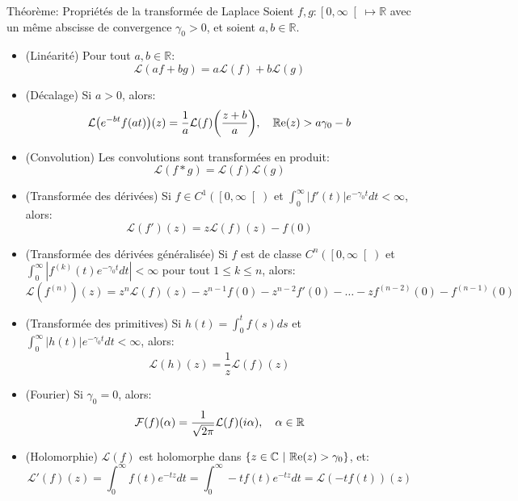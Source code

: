 \documentclass[a4paper]{article}
\begin{document}
\begin{parag}{Théorème: Propriétés de la transformée de Laplace}
    Soient $f, g: \left[0, \infty\right[ \mapsto \mathbb{R}$ avec un même abscisse de convergence $\gamma_0 > 0$, et soient $a, b \in \mathbb{R}$.
    \begin{itemize}
        \item (Linéarité) Pour tout $a, b \in \mathbb{R}$:
            \[\mathcal{L}\left(af + bg\right) = a\mathcal{L}\left(f\right) + b\mathcal{L}\left(g\right)\]
        \item (Décalage) Si $a > 0$, alors:
            \[\mathcal{L}\left(e^{-bt}f\left(at\right)\right)\left(z\right) = \frac{1}{a} \mathcal{L}\left(f\right)\left(\frac{z+b}{a}\right), \mathspace \cre\left(z\right) > a \gamma_0  - b\]
        \item (Convolution) Les convolutions sont transformées en produit:
            \[\mathcal{L}\left(f*g\right) = \mathcal{L}\left(f\right) \mathcal{L}\left(g\right)\]
        \item (Transformée des dérivées) Si $f \in C^1\left(\left[0, \infty\right[ \right)$ et $\int_{0}^{\infty} \left|f'\left(t\right)\right| e^{- \gamma_0 t} dt < \infty$, alors:
            \[\mathcal{L}\left(f'\right)\left(z\right) = z \mathcal{L}\left(f\right)\left(z\right) - f\left(0\right)\]
        \item (Transformée des dérivées généralisée) Si $f$ est de classe $C^n\left(\left[0, \infty\right[ \right)$ et $\int_{0}^{\infty} \left|f^{\left(k\right)}\left(t\right) e^{- \gamma_0 t} dt\right| < \infty$ pour tout $1 \leq k \leq n$, alors:
            \[\mathcal{L}\left(f^{\left(n\right)}\right)\left(z\right) = z^n \mathcal{L}\left(f\right)\left(z\right) - z^{n-1} f\left(0\right) - z^{n-2} f'\left(0\right) - \ldots - z f^{\left(n-2\right)}\left(0\right) - f^{\left(n-1\right)}\left(0\right)\]
        \item (Transformée des primitives) Si $h\left(t\right) = \int_{0}^{t} f\left(s\right)ds$ et $\int_{0}^{\infty} \left|h\left(t\right)\right| e^{-\gamma_0 t} dt < \infty$, alors:
            \[\mathcal{L}\left(h\right)\left(z\right) = \frac{1}{z} \mathcal{L}\left(f\right)\left(z\right)\]
        \item (Fourier) Si $\gamma_0 = 0$, alors:
            \[\mathcal{F}\left(f\right)\left(\alpha\right) = \frac{1}{\sqrt{2\pi}} \mathcal{L}\left(f\right)\left(i\alpha\right), \mathspace \alpha \in \mathbb{R}\]
        \item (Holomorphie) $\mathcal{L}\left(f\right)$ est holomorphe dans $\left\{z \in \mathbb{C} \suchthat \cre\left(z\right) > \gamma_0\right\}$, et:  
        \[\mathcal{L}'\left(f\right)\left(z\right) = \int_{0}^{\infty} f\left(t\right)e^{-tz} dt = \int_{0}^{\infty} -t f\left(t\right) e^{-tz}dt = \mathcal{L}\left(-t f\left(t\right)\right)\left(z\right)\] 
 

\end{itemize}
\end{parag}
\end{document}
